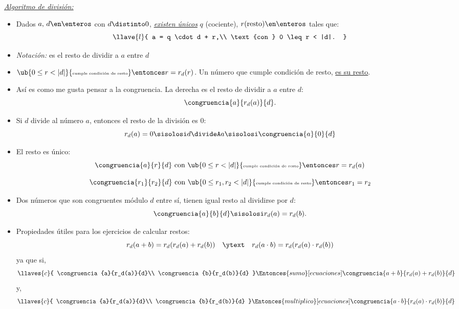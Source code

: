 \textit{\underline{Algoritmo de división:}}\par
\newcommand{\condicionResto}[1]{\ub{0 \leq #1 < |d|}{\text{\tiny cumple condición de resto}}}
\begin{itemize}
  \item
        Dados $a,\, d \en \enteros$ con $d \distinto 0$, \textit{\underline{existen únicos}} $q$ (cociente),
        $r \text{(resto)} \en \enteros$ tales que:
        $$
          \llave{l}{
            a =  q \cdot d + r,\\
            \text{con } 0 \leq r < |d|.
          }
        $$

  \item \textit{Notación: }  es el resto de dividir a $a$ entre $d$

  \item $\condicionResto{r} \entonces r = r_d(r)$. Un número que cumple condición de resto, \underline{es su resto}.

  \item Así es como me gusta pensar a la congruencia. La derecha es el resto de dividir a $a$ entre $d$:
        $$
          \congruencia{a}{r_d(a)}{d}.
        $$

  \item Si $d$ divide al número $a$, entonces el resto de la división es 0:
        $$
          r_d(a) = 0 \sisolosi d \divideA a \sisolosi \congruencia{a}{0}{d}
        $$


  \item El resto es único:
        $$
          \congruencia{a}{r}{d} \text{ con }  \condicionResto{r} \entonces r = r_d(a)
        $$

        $$
          \congruencia{r_1}{r_2}{d} \text{ con } \condicionResto{r_1,r_2} \entonces r_1 = r_2
        $$

  \item Dos números que son congruentes módulo $d$ entre sí, tienen igual resto al dividirse por $d$:
        $$
          \congruencia{a}{b}{d} \sisolosi r_d(a) = r_d(b).
        $$

  \item Propiedades útiles para los ejercicios de calcular restos:
        $$
          r_d(a+b) = r_d(r_d(a) + r_d(b))\quad \ytext \quad r_d(a \cdot b) = r_d(r_d(a) \cdot r_d(b))
        $$
        ya que si,
        $$ \llaves{c}{
            \congruencia{a}{r_d(a)}{d}\\
            \congruencia{b}{r_d(b)}{d}
          }
          \Entonces{sumo}[ecuaciones]
          \congruencia{a + b}{r_d(a) + r_d(b)}{d}
        $$
        y,
        $$ \llaves{c}{
            \congruencia{a}{r_d(a)}{d}\\
            \congruencia{b}{r_d(b)}{d}
          }
          \Entonces{multiplico}[ecuaciones]
          \congruencia{a \cdot b}{r_d(a) \cdot r_d(b)}{d}
        $$
\end{itemize}\bigskip


